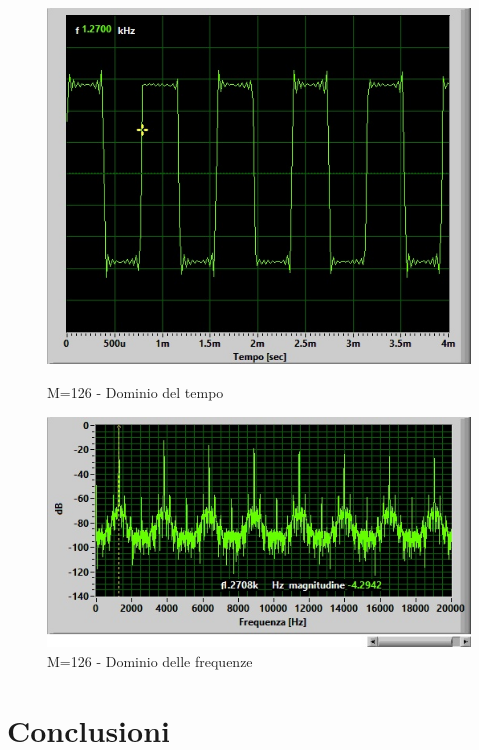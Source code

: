 \documentclass{article}
\begin{document}
\begin{figure}[H]
   \begin{minipage}{0.48\textwidth}
     \centering
     \includegraphics[width=1\linewidth]{m126}
     \caption{M=126 - Dominio del tempo}\label{Fig:Data1}
   \end{minipage}\hfill
   \begin{minipage}{0.48\textwidth}
     \centering
     \includegraphics[width=1\linewidth]{m126f}
     \caption{M=126 - Dominio delle frequenze}\label{Fig:Data2}
   \end{minipage}
\end{figure}



\section{Conclusioni}
\end{document}
